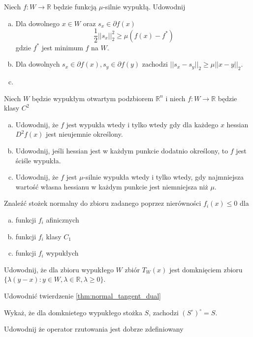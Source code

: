 \documentclass[10pt,a4paper,draft]{report}
\begin{document}
\begin{problem}
Niech $f: W \rightarrow \mathbb{R}$ będzie funkcją $\mu$-silnie wypukłą. Udowodnij
\begin{enumerate}[a)]
\item Dla dowolnego $x \in W$ oraz $s_x \in \partial f(x)$ 
\[
\frac{1}{2} ||s_x||_2^2 \geq \mu (f(x) - f^*)
\]
gdzie $f^*$ jest minimum $f$ na $W$. 
\item Dla dowolnych $s_x \in \partial f(x), s_y \in \partial f(y)$ zachodzi $||s_x - s_y||_2 \geq \mu ||x-y||_2$.
\item 
\end{enumerate}

\end{problem}




\begin{problem}
Niech $W$ będzie wypukłym otwartym podzbiorem $\mathbb{R}^n$ i niech $f : W \rightarrow \mathbb{R}$ będzie klasy $C^2$
\begin{enumerate}[a)]
\item Udowodnij, że $f$ jest wypukła wtedy i tylko wtedy gdy dla każdego $x$ hessian $D^2 f(x)$ jest nieujemnie określony.
\item Udowodnij, jeśli hessian jest w każdym punkcie dodatnio określony, to $f$ jest ściśle wypukła.
\item Udowodnij, że $f$ jest $\mu$-silnie wypukła wtedy i tylko wtedy, gdy najmniejsza wartość własna hessianu w każdym punkcie jest niemniejsza niż $\mu$.
\end{enumerate}
\end{problem}




\begin{problem}
Znaleźć stożek normalny do zbioru zadanego poprzez nierówności $f_i(x) \leq 0$ dla
\begin{enumerate}[a)]
\item funkcji $f_i$ afinicznych
\item funkcji $f_i$ klasy $C_1$
\item funkcji $f_i$ wypukłych
\end{enumerate}

\end{problem}
\begin{problem}
Udowodnij, że dla zbioru wypukłego $W$ zbiór $T_W(x)$ jest domknięciem zbioru $\{ \lambda(y - x) : y \in W, \lambda \in \mathbb{R}, \lambda \geq 0\}$. 
\end{problem}
\begin{problem}
Udowodnić twierdzenie \ref{thm:normal_tangent_dual}
\end{problem}
\begin{problem}
Wykaż, że dla domknietego wypukłego stożka $S$, zachodzi $(S^{\circ})^{\circ} = S$.
\end{problem}
\begin{problem}
Udowodnij że operator rzutowania jest dobrze zdefiniowany
\end{problem}
\end{document}
